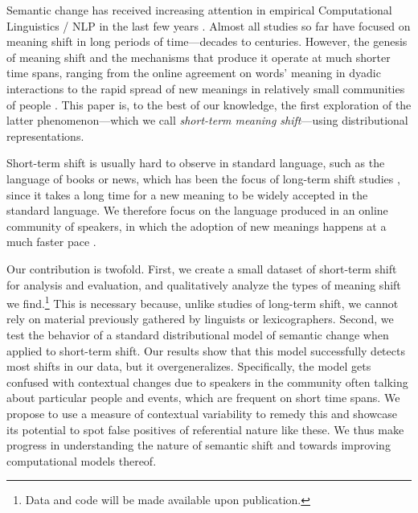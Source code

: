 Semantic change has received increasing attention in empirical Computational Linguistics / NLP in the last few years \cite{tang2018state,KutuzovEtal-coling2018}. Almost all studies so far have focused on meaning shift in long periods of time---decades to centuries. However, the genesis of meaning shift and the mechanisms that produce it operate at much shorter time spans, ranging
from the online agreement on words' meaning in dyadic interactions \cite{brennan1996conceptual} to the rapid spread of new meanings in relatively small communities of people \cite{wenger1998communities,eckert-mcconnellginet1992}.
This paper is, to the best of our knowledge, the first exploration of the latter phenomenon---which we call \textit{short-term meaning shift}---using distributional representations.

Short-term shift is usually hard to observe in standard language, such
as the language of books or news, which has been the focus of
long-term shift studies \cite[e.g.,][]{hamilton2016diachronic,kulkarni2015statistically}, since
it takes a long time for a new meaning to be widely accepted in the standard language. 
We therefore focus on the language produced in an online community of speakers, in which the 
adoption of new meanings happens at a much faster pace \cite{Clark96,hasan2009}.

Our contribution is twofold. First, we create a small dataset of short-term shift for analysis and evaluation, and qualitatively analyze the types of meaning shift we find.\footnote{Data and code will be made available upon
publication.} This is necessary because, unlike studies of long-term shift, we cannot rely on material previously gathered by linguists or lexicographers.
Second, we test the behavior of a standard distributional model of semantic change when
 applied to short-term shift. 
Our results show that this model successfully detects most shifts in our data, but it overgeneralizes. Specifically, the model gets confused with contextual changes due to speakers in the community often talking about particular people and events, which are frequent on short time spans. 
We propose to use a measure of contextual variability to remedy this and showcase its potential to spot false positives of referential nature like these.
We thus make progress in understanding the nature of semantic shift and towards improving computational models thereof.


